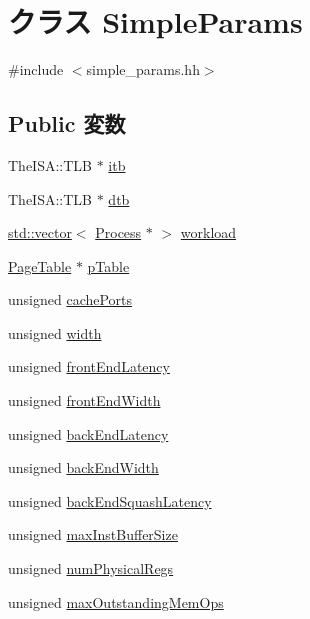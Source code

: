 \hypertarget{classSimpleParams}{
\section{クラス SimpleParams}
\label{classSimpleParams}
}


{\ttfamily \#include $<$simple\_\-params.hh$>$}\subsection*{Public 変数}
\begin{DoxyCompactItemize}
\item 
TheISA::TLB $\ast$ \hyperlink{classSimpleParams_abcb37ddc11515555d8484702697bc4bb}{itb}
\item 
TheISA::TLB $\ast$ \hyperlink{classSimpleParams_ad2fd039621f87592c4b344d4f8948e78}{dtb}
\item 
\hyperlink{classstd_1_1vector}{std::vector}$<$ \hyperlink{classProcess}{Process} $\ast$ $>$ \hyperlink{classSimpleParams_a432242e16e8a636661bec6d50b3501a5}{workload}
\item 
\hyperlink{classPageTable}{PageTable} $\ast$ \hyperlink{classSimpleParams_ad14ffa23ad731f6003755b643f999049}{pTable}
\item 
unsigned \hyperlink{classSimpleParams_a03839700d9f958c25929eaf6c2266322}{cachePorts}
\item 
unsigned \hyperlink{classSimpleParams_a7fa72fbc1c4226b0615406b9d8f540ed}{width}
\item 
unsigned \hyperlink{classSimpleParams_ab26a0d705532ab637d49124145575ae9}{frontEndLatency}
\item 
unsigned \hyperlink{classSimpleParams_aa9a5901ef6f4353dfdbd45cee088c28e}{frontEndWidth}
\item 
unsigned \hyperlink{classSimpleParams_a583d14f0f85ef5b4f5e63382076234a1}{backEndLatency}
\item 
unsigned \hyperlink{classSimpleParams_ae9baf32f2279ce09d356835f2d94cbe1}{backEndWidth}
\item 
unsigned \hyperlink{classSimpleParams_ac25212ca6b3e5acc20582c3270d7514b}{backEndSquashLatency}
\item 
unsigned \hyperlink{classSimpleParams_addd1d01b6c339f09dc8996a4486cd30e}{maxInstBufferSize}
\item 
unsigned \hyperlink{classSimpleParams_ade4a1847683186c0743bd7e8924dce56}{numPhysicalRegs}
\item 
unsigned \hyperlink{classSimpleParams_ad6fbab05ce17a32ecda942c0cf4398ae}{maxOutstandingMemOps}

\end{DoxyCompactItemize}
